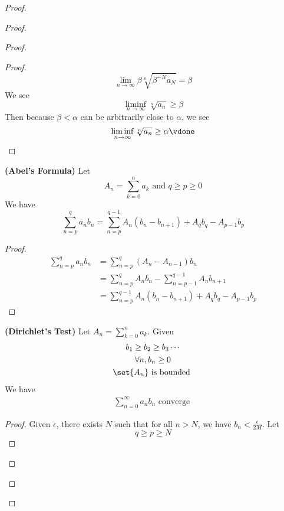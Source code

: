 \documentclass{report}
\begin{document}
\begin{proof}
\begin{proof}
\begin{proof}
\begin{proof}
\begin{equation*}
\lim_{n\to\infty}\beta \sqrt[n]{\beta^{-N}a_N}=\beta 
\end{equation*}
We see
\begin{equation*}
\liminf_{n\to\infty} \sqrt[n]{a_n} \geq \beta 
\end{equation*}
Then because $\beta<\alpha $ can be arbitrarily close to $\alpha $, we see
\begin{equation*}
\liminf_{n\to\infty} \sqrt[n]{a_n}  \geq \alpha \vdone
\end{equation*}
\end{proof}
\begin{lemma}
\label{4.6.4}
\textbf{(Abel's Formula)} Let
\begin{equation*}
A_n=\sum_{k=0}^n a_k\text{ and }q\geq p \geq 0
\end{equation*}
We have
\begin{equation*}
\sum_{n=p}^q a_nb_n=\sum_{n=p}^{q-1}A_n(b_n-b_{n+1})+A_qb_q-A_{p-1}b_p
\end{equation*}
\end{lemma}
\begin{proof}
\begin{align*}
  \sum_{n=p}^q a_nb_n&=\sum_{n=p}^q (A_{n}-A_{n-1})b_n\\
  &=\sum_{n=p}^q A_nb_n-\sum_{n=p-1}^{q-1}A_nb_{n+1}\\
  &=\sum_{n=p}^{q-1}A_n(b_n-b_{n+1})+A_qb_q-A_{p-1}b_p
\end{align*}
\end{proof}
\begin{theorem}
\label{4.6.5}
\textbf{(Dirichlet's Test)} 
Let $A_n=\sum_{k=0}^n a_k$. Given
\begin{gather*}
b_1\geq b_2\geq b_3\cdots\\
\forall n, b_n\geq 0\\
\set{A_n}\text{ is bounded  }
\end{gather*}
We have
\begin{gather*}
\sum_{n=0}^\infty a_nb_n\text{ converge }
\end{gather*}
\end{theorem}
\begin{proof}
Given $\epsilon $, there exists $N$ such that for all $n>N$, we have  $b_n<\frac{\epsilon }{2M}$. Let 
\begin{equation*}
q\geq p\geq N
\end{equation*}

\end{proof}
\end{proof}
\end{proof}
\end{proof}
\end{document}

